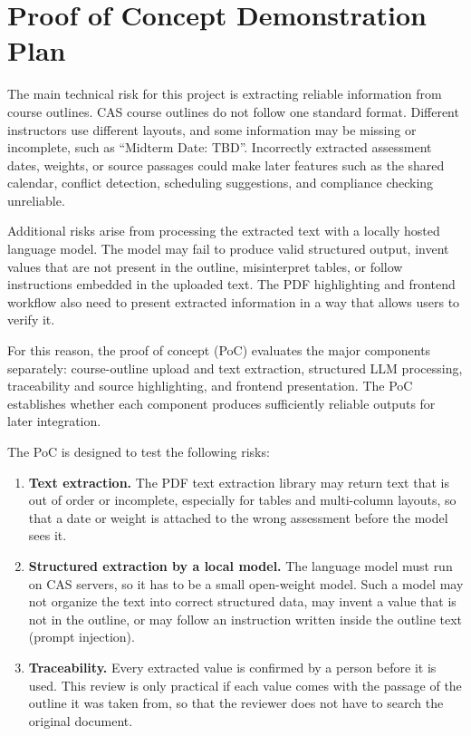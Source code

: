 \documentclass{article}
\begin{document}
\section{Proof of Concept Demonstration Plan} \label{sec_PoC}


The main technical risk for this project is extracting reliable information
from course outlines. CAS course outlines do not follow one standard format.
Different instructors use different layouts, and some information may be
missing or incomplete, such as ``Midterm Date: TBD''. Incorrectly extracted
assessment dates, weights, or source passages could make later features such
as the shared calendar, conflict detection, scheduling suggestions, and
compliance checking unreliable.

Additional risks arise from processing the extracted text with a locally
hosted language model. The model may fail to produce valid structured output,
invent values that are not present in the outline, misinterpret tables, or
follow instructions embedded in the uploaded text. The PDF highlighting and
frontend workflow also need to present extracted information in a way that
allows users to verify it.

For this reason, the proof of concept (PoC) evaluates the major components
separately: course-outline upload and text extraction, structured LLM
processing, traceability and source highlighting, and frontend presentation.
The PoC establishes whether each component produces sufficiently reliable
outputs for later integration.

\bigskip
\noindent The PoC is designed to test the following risks:

\begin{enumerate}
  \item \textbf{Text extraction.} The PDF text extraction library may return
  text that is out of order or incomplete, especially for tables and
  multi-column layouts, so that a date or weight is attached to the wrong
  assessment before the model sees it.
  \item \textbf{Structured extraction by a local model.} The language model
  must run on CAS servers, so it has to be a small open-weight model. Such a
  model may not organize the text into correct structured data, may invent a
  value that is not in the outline, or may follow an instruction written
  inside the outline text (prompt injection).
  \item \textbf{Traceability.} Every extracted value is confirmed by a person
  before it is used. This review is only practical if each value comes with
  the passage of the outline it was taken from, so that the reviewer does not
  have to search the original document.
\end{enumerate}
\end{document}
